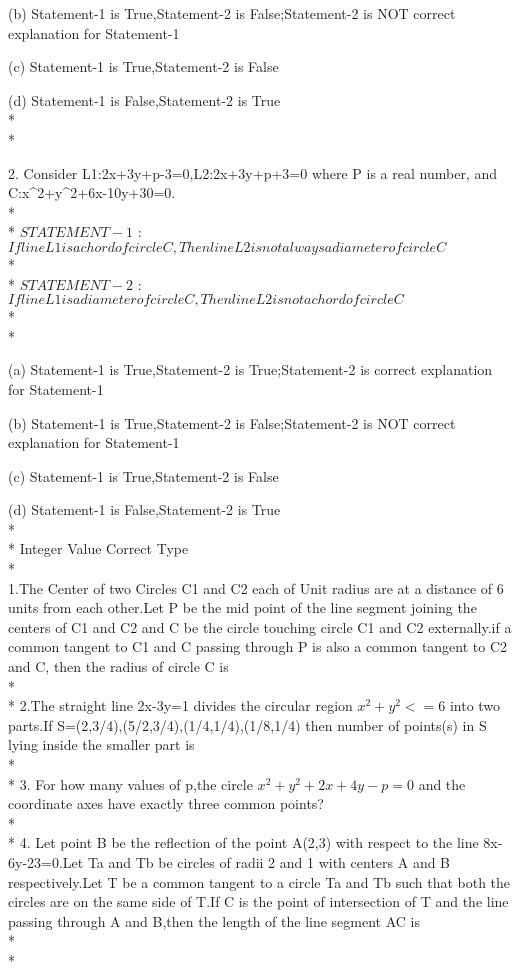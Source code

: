 \documentclass{article}
\begin{document}
\choice (b) Statement-1 is True,Statement-2 is False;Statement-2 is NOT correct explanation for Statement-1

\choice (c) Statement-1 is True,Statement-2 is False 

\choice (d) Statement-1 is False,Statement-2 is True\\*\\*



2. Consider L1:2x+3y+p-3=0,L2:2x+3y+p+3=0 where P is a real number, and C:x^2+y^2+6x-10y+30=0.\\*\\*
{\LARGE $STATEMENT-1$ }:\enspace $If line L1 is a chord of circle C,Then line L2 is not always a diameter of circle C$\\*\\*
{\LARGE $STATEMENT-2$ }:\enspace $If line L1 is a diameter of circle C,Then line L2 is not a chord of circle C$\\*\\*

\choice (a) Statement-1 is True,Statement-2 is True;Statement-2 is correct explanation for Statement-1

\choice (b) Statement-1 is True,Statement-2 is False;Statement-2 is NOT correct explanation for Statement-1

\choice (c) Statement-1 is True,Statement-2 is False 

\choice (d) Statement-1 is False,Statement-2 is True\\*\\*
{\LARGE Integer Value Correct Type }\\*\\
1.The Center of two Circles C1 and C2 each of Unit radius are at a distance of 6 units from each other.Let P be the mid point of the line segment joining the centers of C1 and C2 and C be the circle touching circle C1 and C2 externally.if a common tangent to C1 and C passing through P is also a common tangent to C2 and C, then the radius of circle C is\\*\\*
2.The straight line 2x-3y=1 divides the circular region $x^2+y^2<=6$ into two parts.If S={{(2,3/4),(5/2,3/4),(1/4,1/4),(1/8,1/4)}} then number of points(s) in S lying inside the smaller part is\\*\\*
3. For how many values of p,the circle $x^2+y^2+2x+4y-p=0$ and the coordinate axes have exactly three common points?\\*\\*
4. Let point B be the reflection of the point A(2,3) with respect to the line 8x-6y-23=0.Let Ta and Tb be circles of radii 2 and 1 with centers A and B respectively.Let T be a common tangent to a circle Ta and Tb such that both the circles are on the same side of T.If C is the point of intersection of T and the line passing through A and B,then the length of the line segment AC is \\*\\*
\end{document}
